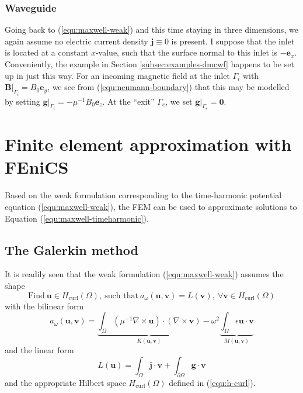 \documentclass[11pt, a4paper]{article}
\begin{document}
\subsubsection{Waveguide}
\label{subsubsec:waveguide}

Going back to (\ref{equ:maxwell-weak}) and this time staying in three dimensions,
we again assume no electric current density $\mathbf{j} \equiv 0$ is present.
I suppose that the inlet is located at a constant $x$-value,
such that the surface normal to this inlet is $-\mathbf{e}_x$. Conveniently, the example 
in Section \ref{subsec:examples-dmcwf} happens to be set up in just this way. For an incoming
magnetic field at the inlet $\Gamma_i$ with $\left.\mathbf{B}\right|_{\Gamma_i} = B_0 \mathbf{e}_y$,
we see from (\ref{equ:neumann-boundary}) that this may be modelled by setting
$\left.\mathbf{g}\right|_{\Gamma_i} = - \mu^{-1} B_0 \mathbf{e}_z$.
At the \enquote{exit} $\Gamma_e$, we set $\left.\mathbf{g}\right|_{\Gamma_e} = \boldsymbol{0}$.

\newpage
\section{Finite element approximation with FEniCS}
\label{sec:fem}

Based on the weak formulation corresponding to the time-harmonic potential equation
(\ref{equ:maxwell-weak}), the \acrfull{FEM} can be used to approximate solutions 
to Equation (\ref{equ:maxwell-timeharmonic}).

\subsection{The Galerkin method}
\label{subsec:fem-theory}

It is readily seen that the weak formulation (\ref{equ:maxwell-weak}) assumes the shape
\begin{equation}
    \text{Find}~\mathbf{u} \in H_{\textrm{curl}}(\Omega),~\text{such that}~a_{\omega}(\mathbf{u}, \mathbf{v}) = L(\mathbf{v}), ~\forall \mathbf{v} \in H_{\textrm{curl}}(\Omega)
\end{equation}
with the bilinear form 
\begin{equation}
    a_{\omega}(\mathbf{u}, \mathbf{v}) = \underbrace{\int_{\Omega} (\mu^{-1} \nabla \times \mathbf{u}) \cdot (\nabla \times \mathbf{v})}_{K(\mathbf{u}, \mathbf{v})}
    - \omega^2 \underbrace{\int_{\Omega} \epsilon \mathbf{u} \cdot \mathbf{v}}_{M(\mathbf{u}, \mathbf{v})} \label{equ:bilinear-form}
\end{equation}
and the linear form 
\begin{equation}
    L(\mathbf{u}) = \int_{\Omega} \mathbf{j} \cdot \mathbf{v} + \int_{\partial \Omega} \mathbf{g} \cdot \mathbf{v} \label{equ:linear-form}
\end{equation}
and the appropriate Hilbert space $H_{\textrm{curl}}(\Omega)$ defined in (\ref{equ:h-curl}).
\end{document}
